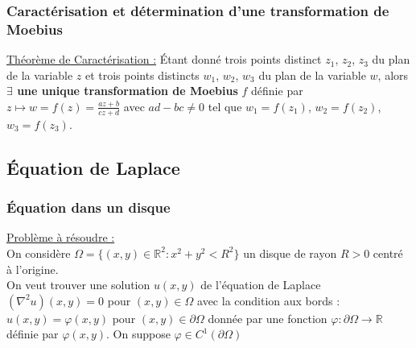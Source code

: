 \documentclass[../main.tex]{subfiles}
\begin{document}
\subsubsection{Caractérisation et détermination d'une transformation de Moebius}
\quad \underline{Théorème de Caractérisation :} Étant donné trois points distinct $z_1$, $z_2$, $z_3$ du plan de la variable $z$ et trois points distincts $w_1$, $w_2$, $w_3$ du plan de la variable $w$, alors \textbf{$\exists$ une unique transformation de Moebius} $f$ définie par $z \mapsto w = f(z) = \frac{az+b}{cz+d}$ avec $ad-bc \neq 0$ tel que $w_1=f(z_1)$, $w_2 = f(z_2)$, $w_3 = f(z_3)$.\\

\subsection{Équation de Laplace}
\subsubsection{Équation dans un disque}
\quad \underline{Problème à résoudre :}\\
On considère $\Omega = \{(x,y) \in \mathbb{R}^2 : x^2+y^2<R^2\}$ un disque de rayon $R>0$ centré à l'origine. \\
On veut trouver une solution $u(x,y)$ de l'équation de Laplace $(\nabla^2 u)(x,y) =0$ pour $(x,y)\in \Omega$ avec la condition aux bords : $u(x,y) = \varphi(x,y)$ pour $(x,y) \in \partial \Omega$ donnée par une fonction $\varphi : \partial \Omega \rightarrow \mathbb{R}$ définie par $\varphi(x,y)$. On suppose $\varphi \in C^1(\partial\Omega)$\\
\end{document}
